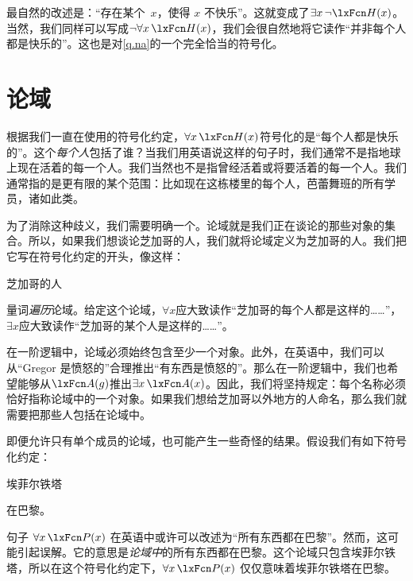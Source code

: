 最自然的改述是：“存在某个~$x$，使得 $x$ 不快乐”。这就变成了$\exists x\, \enot \atom{H}{x}$。当然，我们同样可以写成$\enot\forall x\,\atom{H}{x}$，我们会很自然地将它读作“并非每个人都是快乐的”。这也是对\cref*{q.na}的一个完全恰当的符号化。

\section{论域}
根据我们一直在使用的符号化约定，$\forall x\,\atom{H}{x}$符号化的是“每个人都是快乐的”。这个\emph{每个人}包括了谁？当我们用英语说这样的句子时，我们通常不是指地球上现在活着的每一个人。我们当然也不是指曾经活着或将要活着的每一个人。我们通常指的是更有限的某个范围：比如现在这栋楼里的每个人，芭蕾舞班的所有学员，诸如此类。

为了消除这种歧义，我们需要明确一个。论域就是我们正在谈论的那些对象的集合。所以，如果我们想谈论芝加哥的人，我们就将论域定义为芝加哥的人。我们把它写在符号化约定的开头，像这样：

\begin{ekey}
		\item[\text{论域}] 芝加哥的人
	\end{ekey}

量词\emph{遍历}论域。给定这个论域，$\forall x$应大致读作“芝加哥的每个人都是这样的……”，$\exists x$应大致读作“芝加哥的某个人是这样的……”。


在一阶逻辑中，论域必须始终包含至少一个对象。此外，在英语中，我们可以从“Gregor 是愤怒的”合理推出“有东西是愤怒的”。那么在一阶逻辑中，我们也希望能够从$\atom{A}{g}$推出$\exists x\,\atom{A}{x}$。因此，我们将坚持规定：每个名称必须恰好指称论域中的一个对象。如果我们想给芝加哥以外地方的人命名，那么我们就需要把那些人包括在论域中。

即便允许只有单个成员的论域，也可能产生一些奇怪的结果。假设我们有如下符号化约定：

\begin{ekey}
\item[\text{论域}] 埃菲尔铁塔
\item[\atom{P}{x}]  在巴黎。
\end{ekey}

句子 $\forall x\,\atom{P}{x}$ 在英语中或许可以改述为“所有东西都在巴黎”。然而，这可能引起误解。它的意思是\emph{论域中}的所有东西都在巴黎。这个论域只包含埃菲尔铁塔，所以在这个符号化约定下，$\forall x\,\atom{P}{x}$ 仅仅意味着埃菲尔铁塔在巴黎。

